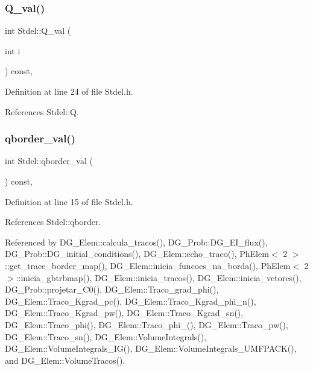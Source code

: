 \subsubsection{\texorpdfstring{Q\+\_\+val()}{Q\_val()}}
{\footnotesize\ttfamily int Stdel\+::\+Q\+\_\+val (\begin{DoxyParamCaption}\item[{int}]{i }\end{DoxyParamCaption}) const\hspace{0.3cm}{\ttfamily [inline]}, {\ttfamily [inherited]}}



Definition at line 24 of file Stdel.\+h.



References Stdel\+::Q.

\mbox{\label{classStdel_a457d20e34fb7a32eb1e4aca6c19f53a2}} 
\subsubsection{\texorpdfstring{qborder\+\_\+val()}{qborder\_val()}}
{\footnotesize\ttfamily int Stdel\+::qborder\+\_\+val (\begin{DoxyParamCaption}{ }\end{DoxyParamCaption}) const\hspace{0.3cm}{\ttfamily [inline]}, {\ttfamily [inherited]}}



Definition at line 15 of file Stdel.\+h.



References Stdel\+::qborder.



Referenced by D\+G\+\_\+\+Elem\+::calcula\+\_\+tracos(), D\+G\+\_\+\+Prob\+::\+D\+G\+\_\+\+E\+I\+\_\+flux(), D\+G\+\_\+\+Prob\+::\+D\+G\+\_\+initial\+\_\+conditions(), D\+G\+\_\+\+Elem\+::echo\+\_\+traco(), Ph\+Elem$<$ 2 $>$\+::get\+\_\+trace\+\_\+border\+\_\+map(), D\+G\+\_\+\+Elem\+::inicia\+\_\+funcoes\+\_\+na\+\_\+borda(), Ph\+Elem$<$ 2 $>$\+::inicia\+\_\+gbtrbmap(), D\+G\+\_\+\+Elem\+::inicia\+\_\+tracos(), D\+G\+\_\+\+Elem\+::inicia\+\_\+vetores(), D\+G\+\_\+\+Prob\+::projetar\+\_\+\+C0(), D\+G\+\_\+\+Elem\+::\+Traco\+\_\+grad\+\_\+phi(), D\+G\+\_\+\+Elem\+::\+Traco\+\_\+\+Kgrad\+\_\+pc(), D\+G\+\_\+\+Elem\+::\+Traco\+\_\+\+Kgrad\+\_\+phi\+\_\+n(), D\+G\+\_\+\+Elem\+::\+Traco\+\_\+\+Kgrad\+\_\+pw(), D\+G\+\_\+\+Elem\+::\+Traco\+\_\+\+Kgrad\+\_\+sn(), D\+G\+\_\+\+Elem\+::\+Traco\+\_\+phi(), D\+G\+\_\+\+Elem\+::\+Traco\+\_\+phi\+\_(), D\+G\+\_\+\+Elem\+::\+Traco\+\_\+pw(), D\+G\+\_\+\+Elem\+::\+Traco\+\_\+sn(), D\+G\+\_\+\+Elem\+::\+Volume\+Integrals(), D\+G\+\_\+\+Elem\+::\+Volume\+Integrals\+\_\+\+I\+G(), D\+G\+\_\+\+Elem\+::\+Volume\+Integrals\+\_\+\+U\+M\+F\+P\+A\+C\+K(), and D\+G\+\_\+\+Elem\+::\+Volume\+Tracos().

